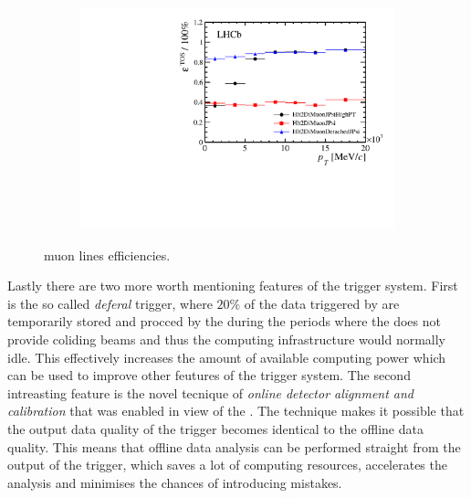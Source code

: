 \begin{figure}[t]
\begin{subfigure}{0.5\textwidth}
    \caption{}
    \label{det_run_one_hlt1_muon_line_eff}
  \end{subfigure}
  \begin{subfigure}{0.5\textwidth}
    \raggedleft
    \includegraphics[width=\textwidth,trim=0.45cm 0cm 0.4cm 0cm, clip=true]{Figures/Chapter2/hlt2_muon_eff}
    \caption{}
    \label{det_run_one_hlt2_muon_line_eff}
  \end{subfigure}
  \caption{\runone muon lines efficiencies.}
  \label{det_run_one_muon_line_eff}
\end{figure}



Lastly there are two more worth mentioning features of the \lhcb trigger system. First is the so called
{\it deferal} trigger, where $20\%$ of the data triggered by \lzero are temporarily stored and procced by the \hltone
during the periods where the \lhc does not provide coliding beams and thus the \lhcb computing infrastructure
would normally idle. This effectively increases the amount of available computing power which can be used
to improve other feutures of the trigger system. The second intreasting feature is the novel tecnique of
{\it online detector alignment and calibration} that was enabled in view of the \runtwo. The technique
makes it possible that the output data quality of the trigger becomes identical to the offline data quality.
This means that offline data analysis can be performed straight from the output of the trigger, which saves
a lot of computing resources, accelerates the analysis and minimises the chances of introducing mistakes.
